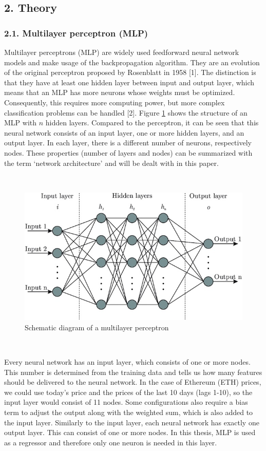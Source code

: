 \documentclass[
]{article}
\begin{document}
\hypertarget{theory}{%
\subsection{2. Theory}\label{theory}}

\hypertarget{MLP}{%
\subsubsection{2.1. Multilayer perceptron (MLP)}\label{MLP}}

Multilayer perceptrons (MLP) are widely used feedforward neural network
models and make usage of the backpropagation algorithm. They are an
evolution of the original perceptron proposed by Rosenblatt in 1958
{[}1{]}. The distinction is that they have at least one hidden layer
between input and output layer, which means that an MLP has more neurons
whose weights must be optimized. Consequently, this requires more
computing power, but more complex classification problems can be handled
{[}2{]}. Figure \ref{fig:mlp_schema} shows the structure of an MLP with
\(n\) hidden layers. Compared to the perceptron, it can be seen that
this neural network consists of an input layer, one or more hidden
layers, and an output layer. In each layer, there is a different number
of neurons, respectively nodes. These properties (number of layers and
nodes) can be summarized with the term `network architecture' and will
be dealt with in this paper.

~

\begin{figure}

{\centering \includegraphics[width=0.6\linewidth]{images/MLP} 

}

\caption{Schematic diagram of a multilayer perceptron}\label{fig:mlp_schema}
\end{figure}

~

Every neural network has an input layer, which consists of one or more
nodes. This number is determined from the training data and tells us how
many features should be delivered to the neural network. In the case of
Ethereum (ETH) prices, we could use today's price and the prices of the
last 10 days (lags 1-10), so the input layer would consist of 11 nodes.
Some configurations also require a bias term to adjust the output along
with the weighted sum, which is also added to the input layer. Similarly
to the input layer, each neural network has exactly one output layer.
This can consist of one or more nodes. In this thesis, MLP is used as a
regressor and therefore only one neuron is needed in this layer.
\end{document}
